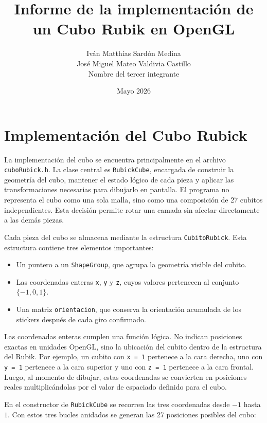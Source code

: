 \documentclass[12pt,a4paper]{article}
\title{\textbf{Informe de la implementación de un Cubo Rubik en OpenGL}}
\author{
Iván Matthías Sardón Medina\\
José Miguel Mateo Valdivia Castillo\\
Nombre del tercer integrante
}
\date{Mayo 2026}
\begin{document}
\maketitle

\section{Implementación del Cubo Rubick}

La implementación del cubo se encuentra principalmente en el archivo \texttt{cuboRubick.h}. La clase central es \texttt{RubickCube}, encargada de construir la geometría del cubo, mantener el estado lógico de cada pieza y aplicar las transformaciones necesarias para dibujarlo en pantalla. El programa no representa el cubo como una sola malla, sino como una composición de 27 cubitos independientes. Esta decisión permite rotar una camada sin afectar directamente a las demás piezas.

Cada pieza del cubo se almacena mediante la estructura \texttt{CubitoRubick}. Esta estructura contiene tres elementos importantes:

\begin{itemize}
    \item Un puntero a un \texttt{ShapeGroup}, que agrupa la geometría visible del cubito.
    \item Las coordenadas enteras \texttt{x}, \texttt{y} y \texttt{z}, cuyos valores pertenecen al conjunto $\{-1,0,1\}$.
    \item Una matriz \texttt{orientacion}, que conserva la orientación acumulada de los stickers después de cada giro confirmado.
\end{itemize}

Las coordenadas enteras cumplen una función lógica. No indican posiciones exactas en unidades OpenGL, sino la ubicación del cubito dentro de la estructura del Rubik. Por ejemplo, un cubito con \texttt{x = 1} pertenece a la cara derecha, uno con \texttt{y = 1} pertenece a la cara superior y uno con \texttt{z = 1} pertenece a la cara frontal. Luego, al momento de dibujar, estas coordenadas se convierten en posiciones reales multiplicándolas por el valor de espaciado definido para el cubo.

En el constructor de \texttt{RubickCube} se recorren las tres coordenadas desde $-1$ hasta $1$. Con estos tres bucles anidados se generan las 27 posiciones posibles del cubo:
\end{document}
